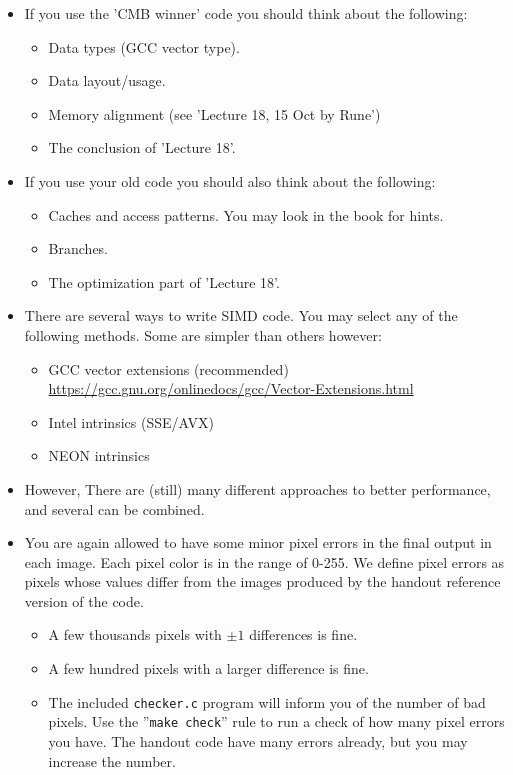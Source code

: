 \documentclass[10pt,a4paper]{article}
\begin{document}
\begin{enumerate}[a)]
\begin{itemize}
	\item If you use the 'CMB winner' code you should think about the following:
	\begin{itemize}
		\item Data types (GCC vector type).
		\item Data layout/usage.
		\item Memory alignment (see 'Lecture 18, 15 Oct by Rune')
		\item The conclusion of 'Lecture 18'.
	\end{itemize}
	\item If you use your old code you should also think about the following:
	\begin{itemize}
		\item Caches and access patterns. You may look in the book for hints.
		\item Branches.
		\item The optimization part of 'Lecture 18'.
	\end{itemize}
	\item There are several ways to write SIMD code. You may select any of the following methods. Some are simpler than others however:
	\begin{itemize}
		\item GCC vector extensions (recommended)\\
				\url{https://gcc.gnu.org/onlinedocs/gcc/Vector-Extensions.html}
		\item Intel intrinsics (SSE/AVX)
		\item NEON intrinsics
	\end{itemize}
	\item However, There are (still) many different approaches to better performance, and several can be combined.
	\item You are again allowed to have some minor pixel errors in the final output in each image. Each pixel color is in the range of 0-255. We define pixel errors as pixels whose values differ from the images produced by the handout reference version of the code. 
	\begin{itemize}
		\item A few thousands pixels with $\pm 1$ differences is fine.
		\item A few hundred pixels with a larger difference is fine.
		\item The included \texttt{checker.c} program will inform you of the number of bad pixels. Use the ''\texttt{make check}'' rule to run a check of how many pixel errors you have. The handout code have many errors already, but you may increase the number.
	\end{itemize}


\end{itemize}
\end{enumerate}
\end{document}
